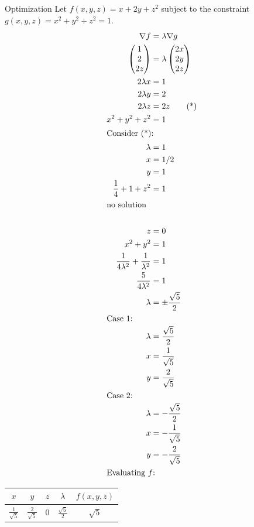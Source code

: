 \documentclass[8pt]{extarticle}
\begin{document}
\begin{problem}{Optimization}
    Let $f(x,y,z) = x + 2y + z^2$ subject to the constraint $g(x,y,z) = x^2 + y^2 + z^2 = 1$. 
    \begin{align*}
      \nabla f &= \lambda \nabla g\\
      \begin{pmatrix}1\\2\\2z\end{pmatrix} &= \lambda \begin{pmatrix}2x\\2y\\2z\end{pmatrix}\\
      2\lambda x &= 1\\
      2\lambda y &= 2\\
      2\lambda z &=2z\tag*{(*)}\\
      x^2 + y^2 + z^2 &= 1\\
      \shortintertext{Consider (*):}
      \lambda &= 1\\
      x &= 1/2\\
      y &= 1\\
      \frac{1}{4} + 1 + z^2 &= 1\\
      \shortintertext{no solution}\\
      z &= 0\\
      x^2 + y^2 &= 1\\
      \frac{1}{4\lambda^2} + \frac{1}{\lambda^2} &= 1\\
      \frac{5}{4\lambda^2} &= 1\\
      \lambda &= \pm\frac{\sqrt{5}}{2}\\
      \shortintertext{Case 1:}
      \lambda &= \frac{\sqrt{5}}{2}\\
      x &= \frac{1}{\sqrt{5}}\\
      y &= \frac{2}{\sqrt{5}}\\
      \shortintertext{Case 2:}
      \lambda &= -\frac{\sqrt{5}}{2}\\
      x &= -\frac{1}{\sqrt{5}}\\
      y &= -\frac{2}{\sqrt{5}}\\
      \shortintertext{Evaluating $f$:}
    \end{align*}
    \begin{center}
      \renewcommand{\arraystretch}{4}
      \begin{tabular}{c|c|c|c|c}
        $x$ & $y$ & $z$ & $\lambda$ & $f(x,y,z)$\\
        \hline
        $\displaystyle\frac{1}{\sqrt{5}}$ & $\displaystyle\frac{2}{\sqrt{5}}$ & 0 & $\displaystyle\frac{\sqrt{5}}{2}$ & $\sqrt{5}$\\

\end{tabular}
\end{center}
\end{problem}
\end{document}
